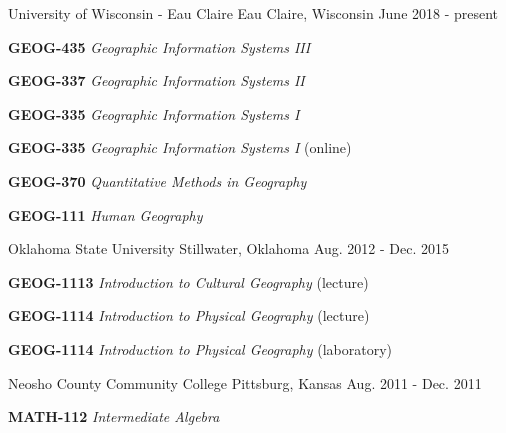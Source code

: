 

  \begin{cventries}
    \cventry
      {}
      {University of Wisconsin - Eau Claire}
      {Eau Claire, Wisconsin}
      {June 2018 - present}
      {
        \vspace{-3mm}
        \begin{expitems}
        \item {\textbf{GEOG-435} \textit{Geographic Information Systems III}}
        \item {\textbf{GEOG-337} \textit{Geographic Information Systems II}}
        \item {\textbf{GEOG-335} \textit{Geographic Information Systems I}}
        \item {\textbf{GEOG-335} \textit{Geographic Information Systems I} (online)}
        \item {\textbf{GEOG-370} \textit{Quantitative Methods in Geography}}
        \item {\textbf{GEOG-111} \textit{Human Geography}}
        \end{expitems}
      }
  
    \cventry
      {}
      {Oklahoma State University}
      {Stillwater, Oklahoma}
      {Aug. 2012 - Dec. 2015}
      {
        \vspace{-3mm}
        \begin{expitems}
        \item {\textbf{GEOG-1113} \textit{Introduction to Cultural Geography}
            (lecture)}
        \item {\textbf{GEOG-1114} \textit{Introduction to Physical Geography} (lecture)}
        \item {\textbf{GEOG-1114} \textit{Introduction to Physical Geography} (laboratory)}
        \end{expitems}
      }
  
    \cventry
      {}
      {Neosho County Community College}
      {Pittsburg, Kansas}
      {Aug. 2011 - Dec. 2011}
      {
        \vspace{-3mm}
        \begin{expitems}
          \item {\textbf{MATH-112} \textit{Intermediate Algebra}}
        \end{expitems}
      }
  
  \end{cventries}

